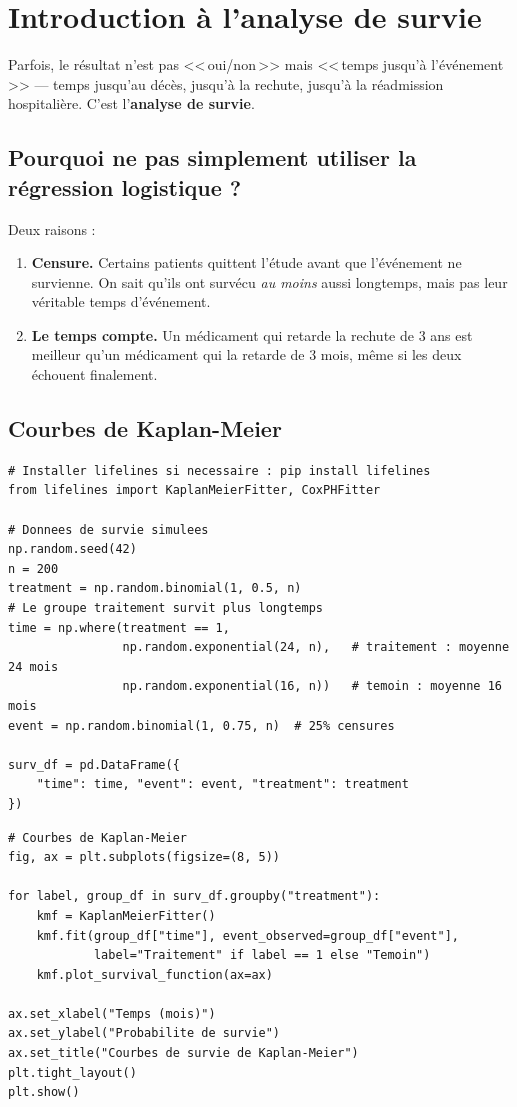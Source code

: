 \section{Introduction \`a l'analyse de survie}

Parfois, le r\'esultat n'est pas <<\,oui/non\,>> mais <<\,temps jusqu'\`a l'\'ev\'enement\,>> --- temps jusqu'au d\'ec\`es, jusqu'\`a la rechute, jusqu'\`a la r\'eadmission hospitali\`ere. C'est l'\textbf{analyse de survie}.

\subsection{Pourquoi ne pas simplement utiliser la r\'egression logistique ?}

Deux raisons :
\begin{enumerate}
  \item \textbf{Censure.} Certains patients quittent l'\'etude avant que l'\'ev\'enement ne survienne. On sait qu'ils ont surv\'ecu \emph{au moins} aussi longtemps, mais pas leur v\'eritable temps d'\'ev\'enement.
  \item \textbf{Le temps compte.} Un m\'edicament qui retarde la rechute de 3 ans est meilleur qu'un m\'edicament qui la retarde de 3 mois, m\^eme si les deux \'echouent finalement.
\end{enumerate}

\subsection{Courbes de Kaplan-Meier}

\begin{verbatim}
# Installer lifelines si necessaire : pip install lifelines
from lifelines import KaplanMeierFitter, CoxPHFitter

# Donnees de survie simulees
np.random.seed(42)
n = 200
treatment = np.random.binomial(1, 0.5, n)
# Le groupe traitement survit plus longtemps
time = np.where(treatment == 1,
                np.random.exponential(24, n),   # traitement : moyenne 24 mois
                np.random.exponential(16, n))   # temoin : moyenne 16 mois
event = np.random.binomial(1, 0.75, n)  # 25% censures

surv_df = pd.DataFrame({
    "time": time, "event": event, "treatment": treatment
})
\end{verbatim}

\begin{verbatim}
# Courbes de Kaplan-Meier
fig, ax = plt.subplots(figsize=(8, 5))

for label, group_df in surv_df.groupby("treatment"):
    kmf = KaplanMeierFitter()
    kmf.fit(group_df["time"], event_observed=group_df["event"],
            label="Traitement" if label == 1 else "Temoin")
    kmf.plot_survival_function(ax=ax)

ax.set_xlabel("Temps (mois)")
ax.set_ylabel("Probabilite de survie")
ax.set_title("Courbes de survie de Kaplan-Meier")
plt.tight_layout()
plt.show()
\end{verbatim}

